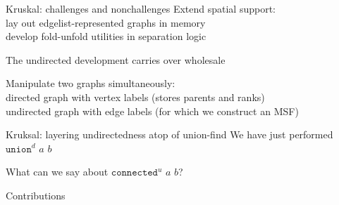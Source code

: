 \documentclass[usenames, xcolor=dvipsnames]{beamer}
\newcommand{\m}[1]{\ensuremath{\mathit{#1}}} %
\begin{document}
\begin{frame}{Kruskal: challenges and nonchallenges}
Extend spatial support: \\
\hspace{1em} lay out edgelist-represented graphs in memory \\
\hspace{1em} develop fold-unfold utilities in separation logic

\bigskip

The undirected development carries over wholesale

\bigskip

Manipulate two graphs simultaneously: \\
\hspace{1em}directed graph with vertex labels (stores parents and ranks) \\
\hspace{1em}undirected graph with edge labels (for which we construct an MSF)
\end{frame}

\begin{frame}{Kruksal: layering undirectedness atop of union-find}
  We have just performed $\texttt{union}^{d}$ \m{a} \m{b} \\
  \vspace{2em}
  {\centering
  
  
  }
 \pause \bigskip
  What can we say about $\texttt{connected}^{u}$ \m{a} \m{b}? \uncover<3>{$\texttt{connected}^{u}$ \m{c} \m{b}?}
\end{frame}

\begin{frame}{Contributions}
\bigskip
{}
\bigskip
{}
\bigskip
{}
\end{frame}
\end{document}
